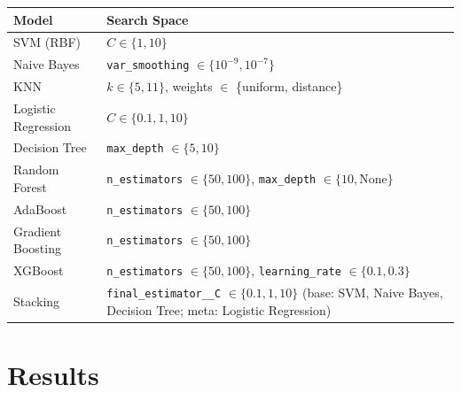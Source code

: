 \documentclass[12pt,a4paper]{article}
\begin{document}
\begin{longtable}{ll}
\toprule
Model & Search Space \\
\midrule
SVM (RBF) & $C \in \{1, 10\}$ \\
Naive Bayes & \texttt{var\_smoothing} $\in \{10^{-9}, 10^{-7}\}$ \\
KNN & $k \in \{5, 11\}$, weights $\in$ \{uniform, distance\} \\
Logistic Regression & $C \in \{0.1, 1, 10\}$ \\
Decision Tree & \texttt{max\_depth} $\in \{5, 10\}$ \\
Random Forest & \texttt{n\_estimators} $\in \{50, 100\}$, \texttt{max\_depth} $\in \{10,
\text{None}\}$ \\
AdaBoost & \texttt{n\_estimators} $\in \{50, 100\}$ \\
Gradient Boosting & \texttt{n\_estimators} $\in \{50, 100\}$ \\
XGBoost & \texttt{n\_estimators} $\in \{50, 100\}$, \texttt{learning\_rate} $\in \{0.1,
0.3\}$ \\
Stacking & \texttt{final\_estimator\_\_C} $\in \{0.1, 1, 10\}$ (base: SVM, Naive Bayes,
Decision Tree; meta: Logistic Regression) \\
\bottomrule
\end{longtable}

\section{Results}
\end{document}
